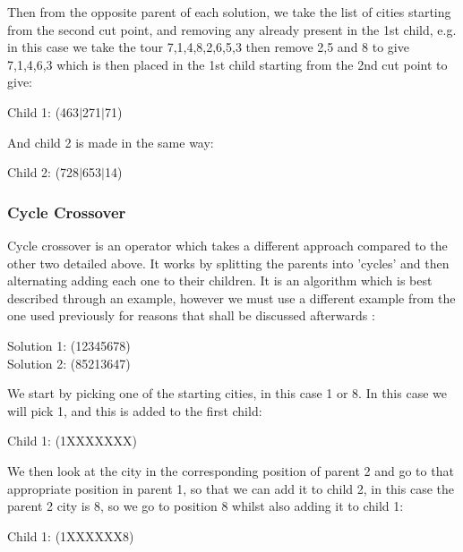 \documentclass[11pt,a4paper,titlepage]{article}
\begin{document}
Then from the opposite parent of each solution, we take the list of cities starting from the second cut point, and removing any already present in the 1st child, e.g. in this case we take the tour 7,1,4,8,2,6,5,3 then remove 2,5 and 8 to give 7,1,4,6,3 which is then placed in the 1st child starting from the 2nd cut point to give:

\begin{center}\Large
Child 1: (463$|$271$|$71)
\end{center}

And child 2 is made in the same way:

\begin{center}\Large
Child 2: (728$|$653$|$14)
\end{center}

\subsubsection{Cycle Crossover}

Cycle crossover is an operator which takes a different approach compared to the other two detailed above. It works by splitting the parents into 'cycles' and then alternating adding each one to their children. It is an algorithm which is best described through an example, however we must use a different example from the one used previously for reasons that shall be discussed afterwards \cite{GACrossover}:

\begin{center}\Large
Solution 1: (12345678)\\
Solution 2: (85213647)
\end{center}

We start by picking one of the starting cities, in this case 1 or 8. In this case we will pick 1, and this is added to the first child:

\begin{center}\Large
Child 1: (1XXXXXXX)\\
\end{center}

We then look at the city in the corresponding position of parent 2 and go to that appropriate position in parent 1, so that we can add it to child 2, in this case the parent 2 city is 8, so we go to position 8 whilst also adding it to child 1:

\begin{center}\Large
Child 1: (1XXXXXX8)\\
\end{center}
\end{document}
